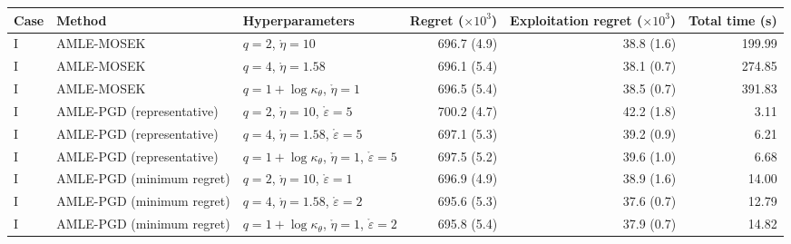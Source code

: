 \begin{tabular}{lllrrr}
\toprule
Case & Method & Hyperparameters & Regret ($\times10^3$) & Exploitation regret ($\times10^3$) & Total time (s) \\
\midrule
I & AMLE-MOSEK & $q=2$, $\mathring\eta=10$ & 696.7 (4.9) & 38.8 (1.6) & 199.99 \\
I & AMLE-MOSEK & $q=4$, $\mathring\eta=1.58$ & 696.1 (5.4) & 38.1 (0.7) & 274.85 \\
I & AMLE-MOSEK & $q=1+\log\kappa_\theta$, $\mathring\eta=1$ & 696.5 (5.4) & 38.5 (0.7) & 391.83 \\
I & AMLE-PGD (representative) & $q=2$, $\mathring\eta=10$, $\mathring\varepsilon=5$ & 700.2 (4.7) & 42.2 (1.8) & 3.11 \\
I & AMLE-PGD (representative) & $q=4$, $\mathring\eta=1.58$, $\mathring\varepsilon=5$ & 697.1 (5.3) & 39.2 (0.9) & 6.21 \\
I & AMLE-PGD (representative) & $q=1+\log\kappa_\theta$, $\mathring\eta=1$, $\mathring\varepsilon=5$ & 697.5 (5.2) & 39.6 (1.0) & 6.68 \\
I & AMLE-PGD (minimum regret) & $q=2$, $\mathring\eta=10$, $\mathring\varepsilon=1$ & 696.9 (4.9) & 38.9 (1.6) & 14.00 \\
I & AMLE-PGD (minimum regret) & $q=4$, $\mathring\eta=1.58$, $\mathring\varepsilon=2$ & 695.6 (5.3) & 37.6 (0.7) & 12.79 \\
I & AMLE-PGD (minimum regret) & $q=1+\log\kappa_\theta$, $\mathring\eta=1$, $\mathring\varepsilon=2$ & 695.8 (5.4) & 37.9 (0.7) & 14.82 \\
\bottomrule
\end{tabular}
